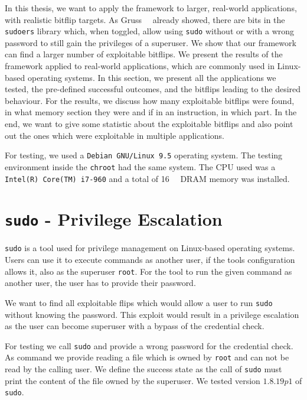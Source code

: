 In this thesis, we want to apply the framework to larger, real-world
applications, with realistic bitflip targets. As
Gruss~\etal~\cite{flipinthewall} already showed, there are bits in the
\texttt{sudoers} library which, when toggled, allow using \texttt{sudo} without
or with a wrong password to still gain the privileges of a superuser. We show
that our framework can find a larger number of exploitable bitflips. We present
the results of the framework applied to real-world applications, which are
commonly used in Linux-based operating systems. In this section, we present all
the applications we tested, the pre-defined successful outcomes, and the
bitflips leading to the desired behaviour. For the results, we discuss how many
exploitable bitflips were found, in what memory section they were and if in an
instruction, in which part. In the end, we want to give some statistic about the
exploitable bitflips and also point out the ones which were exploitable in
multiple applications.

For testing, we used a \texttt{Debian GNU/Linux 9.5} operating system. The
testing environment inside the \texttt{chroot} had the same system. The CPU used
was a \mbox{\texttt{Intel(R) Core(TM) i7-960}} and a total of
\SI{16}{\giga\byte} DRAM memory was installed.

\section{\texttt{sudo} - Privilege Escalation}

\texttt{sudo} is a tool used for privilege management on Linux-based operating
systems. Users can use it to execute commands as another user, if the
tool\textquotesingle s configuration allows it, also as the superuser
\texttt{root}. For the tool to run the given command as another user, the user
has to provide their password.

We want to find all exploitable flips which would allow a user to run
\texttt{sudo} without knowing the password. This exploit would result in a
privilege escalation as the user can become superuser with a bypass of the
credential check.

For testing we call \texttt{sudo} and provide a wrong password for the
credential check. As command we provide reading a file which is owned by
\texttt{root} and can not be read by the calling user. We define the success
state as the call of \texttt{sudo} must print the content of the file owned by
the superuser. We tested version $1.8.19p1$ of \texttt{sudo}.

